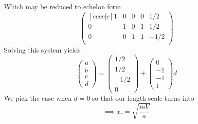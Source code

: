 \documentclass[12pt]{article}
\begin{document}
Which may be reduced to echelon form
\begin{equation}
  \begin{pmatrix}[cccc|c]
    1 & 0 & 0 & 0 & 1/2 \\
    0 & 1 & 0 & 1 & 1/2 \\
    0 & 0 & 1 & 1 & -1/2 \\
  \end{pmatrix}
\end{equation}
Solving this system yields
\begin{equation}
  \begin{pmatrix}
    a \\ b \\ c \\ d
  \end{pmatrix} =
  \begin{pmatrix}
    1/2 \\ 1/2 \\ -1/2 \\ 0
  \end{pmatrix} +
  \begin{pmatrix}
    0 \\ -1 \\ -1 \\ 1
  \end{pmatrix}
  d
\end{equation}
We pick the case when $d=0$ so that our length scale turns into
\begin{equation}
  \label{eq:4-length-scale}
  \implies x_c = \sqrt{\frac{mV}{a}}
\end{equation}
\end{document}
